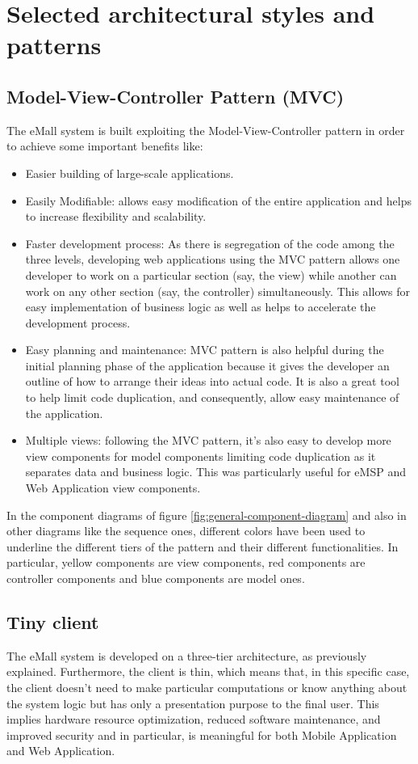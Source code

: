 \documentclass[a4paper]{report}
\begin{document}
\section{Selected architectural styles and patterns}

\subsection{Model-View-Controller Pattern (MVC)}
The eMall system is built exploiting the Model-View-Controller pattern in order to achieve some important benefits like:
\begin{itemize}
    \item Easier building of large-scale applications.
    \item Easily Modifiable: allows easy modification of the entire application and helps to increase flexibility and scalability.
    \item Faster development process: As there is segregation of the code among the three levels, developing web applications using the MVC pattern allows one developer to work on a particular section (say, the view) while another can work on any other section (say, the controller) simultaneously. This allows for easy implementation of business logic as well as helps to accelerate the development process.
    \item Easy planning and maintenance: MVC pattern is also helpful during the initial planning phase of the application because it gives the developer an outline of how to arrange their ideas into actual code. It is also a great tool to help limit code duplication, and consequently, allow easy maintenance of the application.
    \item Multiple views: following the MVC pattern, it's also easy to develop more view components for model components limiting code duplication as it separates data and business logic. This was particularly useful for eMSP and Web Application view components.
\end{itemize}
In the component diagrams of figure \ref{fig:general-component-diagram} and also in other diagrams like the sequence ones, different colors have been used to underline the different tiers of the pattern and their different functionalities. In particular, yellow components are view components, red components are controller components and blue components are model ones.

\subsection{Tiny client}
The eMall system is developed on a three-tier architecture, as previously explained. Furthermore, the client is thin, which means that, in this specific case, the client doesn't need to make particular computations or know anything about the system logic but has only a presentation purpose to the final user. This implies hardware resource optimization, reduced software maintenance, and improved security and in particular, is meaningful for both Mobile Application and Web Application.
\end{document}
